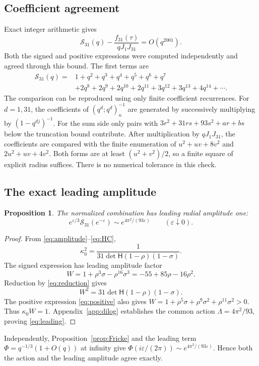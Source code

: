 \documentclass[11pt,reqno]{amsart}
\newcommand{\Ssum}{\mathcal S_{31}}
\newtheorem{proposition}[theorem]{Proposition}
\theoremstyle{remark}
\numberwithin{equation}{section}
\begin{document}
\subsection{Coefficient agreement}
Exact integer arithmetic gives
\begin{equation}\label{eq:finitecheck}
 \Ssum(q)-\frac{f_{31}(\tau)}{qJ_1J_{31}}=O(q^{2001}).
\end{equation}
Both the signed and positive expressions were computed independently
and agreed through this bound. The first terms are
\[
\begin{split}
 \Ssum(q)={}&1+q^2+q^3+q^4+q^5+q^6+q^7\\
 &+2q^8+2q^9+2q^{10}+2q^{11}+3q^{12}+3q^{13}+4q^{14}+\cdots.
\end{split}
\]
The comparison can be reproduced using only finite coefficient
recurrences. For $d=1,31$, the coefficients of $(q^d;q^d)_n^{-1}$
are generated by successively multiplying by $(1-q^{dj})^{-1}$.
For the sum side only pairs with
$3r^2+31rs+93s^2+ar+bs$ below the truncation bound contribute.
After multiplication by $qJ_1J_{31}$, the coefficients are compared
with the finite enumeration of
$u^2+uv+8v^2$ and $2u^2+uv+4v^2$.
Both forms are at least $(u^2+v^2)/2$, so a finite square of
explicit radius suffices. There is no numerical tolerance in this check.

\subsection{The exact leading amplitude}
\begin{proposition}\label{prop:amplitude}
The normalized combination has leading radial amplitude one:
\begin{equation}\label{eq:leading}
 e^{\varepsilon/3}\Ssum(e^{-\varepsilon})
 \sim e^{4\pi^2/(93\varepsilon)}
 \qquad(\varepsilon\downarrow0).
\end{equation}
\end{proposition}
\begin{proof}
From \eqref{eq:amplitude}--\eqref{eq:HC},
\[
 \kappa_0^2=\frac1{31\det\mathsf H(1-\rho)(1-\sigma)}.
\]
The signed expression has leading amplitude factor
\[
 W=1+\rho^3\sigma-\rho^{16}\sigma^3=-55+85\rho-16\rho^2.
\]
Reduction by \eqref{eq:reduction} gives
\begin{equation}\label{eq:amplitude-certificate}
 W^2=31\det\mathsf H(1-\rho)(1-\sigma).
\end{equation}
The positive expression \eqref{eq:positive} also gives
$W=1+\rho^5\sigma+\rho^9\sigma^2+\rho^{11}\sigma^2>0$.
Thus $\kappa_0W=1$. Appendix~\ref{app:dilog} establishes the common
action $\Lambda=4\pi^2/93$, proving \eqref{eq:leading}.
\end{proof}
Independently, Proposition~\ref{prop:Fricke} and the leading term
$\Phi=q^{-1/3}(1+O(q))$ at infinity give
$\Phi(i\varepsilon/(2\pi))\sim e^{4\pi^2/(93\varepsilon)}$.
Hence both the action and the leading amplitude agree exactly.
\end{document}
